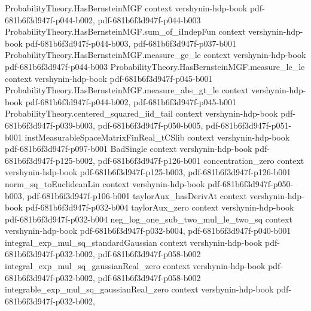 \begin{theorem}
\label{johnson_lindenstrauss_subgaussian_dist}
\leanok
{}
\proofstep
  {ProbabilityTheory.HasBernsteinMGF}
  {context}
  {vershynin-hdp-book}
  {pdf-681b6f3d947f-p044-b002,
    pdf-681b6f3d947f-p044-b003}
\proofstep
  {ProbabilityTheory.HasBernsteinMGF.sum_of_iIndepFun}
  {context}
  {vershynin-hdp-book}
  {pdf-681b6f3d947f-p044-b003,
    pdf-681b6f3d947f-p037-b001}
\proofstep
  {ProbabilityTheory.HasBernsteinMGF.measure_ge_le}
  {context}
  {vershynin-hdp-book}
  {pdf-681b6f3d947f-p044-b003}
\proofstep
  {ProbabilityTheory.HasBernsteinMGF.measure_le_le}
  {context}
  {vershynin-hdp-book}
  {pdf-681b6f3d947f-p045-b001}
\proofstep
  {ProbabilityTheory.HasBernsteinMGF.measure_abs_gt_le}
  {context}
  {vershynin-hdp-book}
  {pdf-681b6f3d947f-p044-b002,
    pdf-681b6f3d947f-p045-b001}
\proofstep
  {ProbabilityTheory.centered_squared_iid_tail}
  {context}
  {vershynin-hdp-book}
  {pdf-681b6f3d947f-p039-b003,
    pdf-681b6f3d947f-p050-b005,
    pdf-681b6f3d947f-p051-b001}
\proofstep
  {instMeasurableSpaceMatrixFinReal_tCSlib}
  {context}
  {vershynin-hdp-book}
  {pdf-681b6f3d947f-p097-b001}
\proofstep
  {BadSingle}
  {context}
  {vershynin-hdp-book}
  {pdf-681b6f3d947f-p125-b002,
    pdf-681b6f3d947f-p126-b001}
\proofstep
  {concentration_zero}
  {context}
  {vershynin-hdp-book}
  {pdf-681b6f3d947f-p125-b003,
    pdf-681b6f3d947f-p126-b001}
\proofstep
  {norm_sq_toEuclideanLin}
  {context}
  {vershynin-hdp-book}
  {pdf-681b6f3d947f-p050-b003,
    pdf-681b6f3d947f-p106-b001}
\proofstep
  {taylorAux_hasDerivAt}
  {context}
  {vershynin-hdp-book}
  {pdf-681b6f3d947f-p032-b004}
\proofstep
  {taylorAux_zero}
  {context}
  {vershynin-hdp-book}
  {pdf-681b6f3d947f-p032-b004}
\proofstep
  {neg_log_one_sub_two_mul_le_two_sq}
  {context}
  {vershynin-hdp-book}
  {pdf-681b6f3d947f-p032-b004,
    pdf-681b6f3d947f-p040-b001}
\proofstep
  {integral_exp_mul_sq_standardGaussian}
  {context}
  {vershynin-hdp-book}
  {pdf-681b6f3d947f-p032-b002,
    pdf-681b6f3d947f-p058-b002}
\proofstep
  {integral_exp_mul_sq_gaussianReal_zero}
  {context}
  {vershynin-hdp-book}
  {pdf-681b6f3d947f-p032-b002,
    pdf-681b6f3d947f-p058-b002}
\proofstep
  {integrable_exp_mul_sq_gaussianReal_zero}
  {context}
  {vershynin-hdp-book}
  {pdf-681b6f3d947f-p032-b002,
}
\end{theorem}

